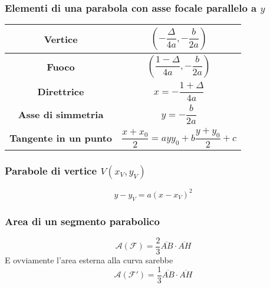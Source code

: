 \subsubsection{Elementi di una parabola con asse focale parallelo a $y$}
\begin{center}
	\begin{tabular}{c | c}
		\textbf{Vertice} & $\left(-\dfrac{\Delta}{4a},-\dfrac{b}{2a}\right)$\\\hline
		\textbf{Fuoco} & $\left(\dfrac{1-\Delta}{4a},-\dfrac{b}{2a}\right)$\\\hline
		\textbf{Direttrice} & $x=-\dfrac{1+\Delta}{4a}$\\\hline
		\textbf{Asse di simmetria} & $y=-\dfrac{b}{2a}$\\\hline
		\textbf{Tangente in un punto} & $\dfrac{x+x_0}{2}=ayy_0+b\dfrac{y+y	_0}{2}+c$
	\end{tabular}
\end{center}

\subsubsection{Parabole di vertice $V(x_V,y_V)$}
\begin{equation*}
y-y_V=a(x-x_V)^2
\end{equation*}

\subsubsection{Area di un segmento parabolico}
\begin{center}
\end{center}
\begin{equation*}
\mathscr{A}(\mathscr{F}) = \frac{2}{3}\overline{AB}\cdot\overline{AH}
\end{equation*}
E ovviamente l'area esterna alla curva sarebbe
\begin{equation*}
\mathscr{A}(\mathscr{F}') = \frac{1}{3}\overline{AB}\cdot\overline{AH}
\end{equation*}

